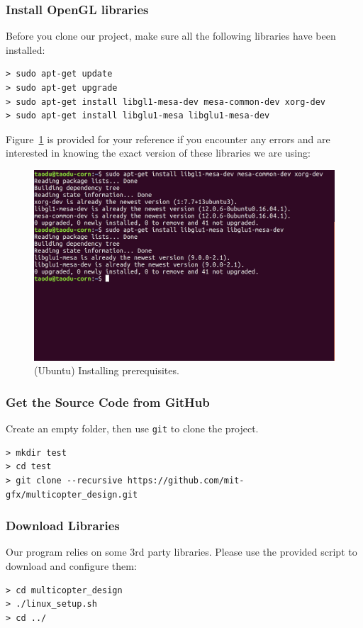 \subsubsection{Install OpenGL libraries} Before you clone our project, make sure all the following libraries have been installed:
\begin{verbatim}
> sudo apt-get update
> sudo apt-get upgrade
> sudo apt-get install libgl1-mesa-dev mesa-common-dev xorg-dev
> sudo apt-get install libglu1-mesa libglu1-mesa-dev
\end{verbatim}
Figure~\ref{fig:ubuntu_opengl_install} is provided for your reference if you encounter any errors and are interested in knowing the exact version of these libraries we are using:
\begin{figure}[!htb]
  \centering
  \includegraphics[width=0.75\linewidth]{ubuntu_opengl_install}
  \caption{(Ubuntu) Installing prerequisites.}
  \label{fig:ubuntu_opengl_install}
\end{figure}

\subsubsection{Get the Source Code from GitHub}
Create an empty folder, then use \texttt{git} to clone the project.
\begin{verbatim}
> mkdir test
> cd test
> git clone --recursive https://github.com/mit-gfx/multicopter_design.git
\end{verbatim}

\subsubsection{Download Libraries}
Our program relies on some 3rd party libraries. Please use the provided script to download and configure them:
\begin{verbatim}
> cd multicopter_design
> ./linux_setup.sh
> cd ../
\end{verbatim}

